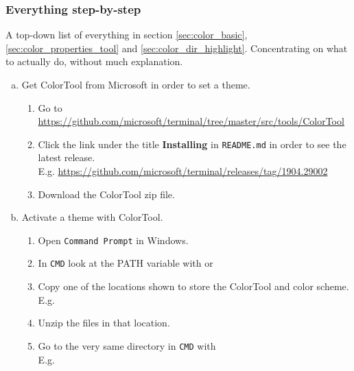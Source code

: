 \subsubsection{Everything step-by-step}

A top-down list of everything in section \ref{sec:color_basic}, \ref{sec:color_properties_tool} and \ref{sec:color_dir_highlight}. Concentrating on what to actually do, without much explanation.

\begin{enumerate}[a)]
    
    \item Get ColorTool from Microsoft in order to set a theme.
    \begin{enumerate}[1.]
        \item Go to \url{https://github.com/microsoft/terminal/tree/master/src/tools/ColorTool}
    
        \item Click the link under the title \textbf{Installing} in \texttt{README.md} in order to see the latest release.\\E.g. \url{https://github.com/microsoft/terminal/releases/tag/1904.29002}
        
        \item Download the ColorTool zip file.
    \end{enumerate}
    
    \item Activate a theme with ColorTool.
    \begin{enumerate}[1.]
        \item Open \texttt{Command Prompt} in Windows.
        
        \item In \texttt{CMD} look at the PATH variable with  or 
        
        \item Copy one of the locations shown to store the ColorTool and color scheme.\\E.g. 
        
        \item Unzip the files in that location.
        
        \item Go to the very same directory in \texttt{CMD} with\\E.g. 
        

\end{enumerate}
\end{enumerate}
